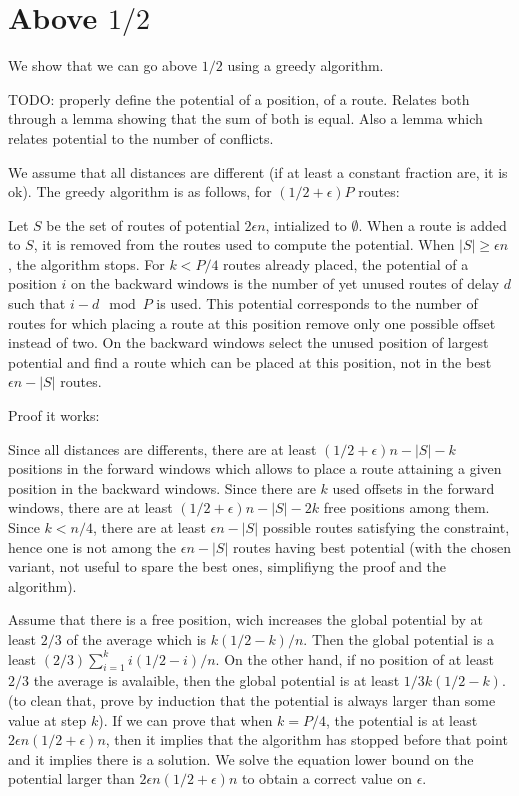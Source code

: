 \documentclass[10pt, conference, letterpaper]{IEEEtran}
\begin{document}
\section{Above $1/2$}

We show that we can go above $1/2$ using a greedy algorithm.

TODO: properly define the potential of a position, of a route. Relates both through a lemma 
showing that the sum of both is equal. 
Also a lemma which relates potential to the number of conflicts. 

We assume that all distances are different (if at least a constant fraction are, it is ok).
The greedy algorithm is as follows, for $(1/2 + \epsilon)P$ routes:

Let $S$ be the set of routes of potential $2\epsilon n$, intialized to $\emptyset$.
When a route is added to $S$, it is removed from the routes used to compute the potential. 
When $|S| \geq \epsilon n$, the algorithm stops.
For $k < P/4$ routes already placed, the potential of a position $i$ on the backward windows 
is the number of yet unused routes of delay $d$ such that $i-d \mod P$ is used.
This potential corresponds to the number of routes for which placing a route at this position
remove only one possible offset instead of two.
On the backward windows select the unused position of largest potential and find a route which can be 
placed at this position, not in the best $\epsilon n - |S|$ routes.  

Proof it works: 

Since all distances are differents, 
there are at least $(1/2 + \epsilon)n - |S|- k$ positions in the forward windows which allows
to place a route attaining a given position in the backward windows. 
Since there are $k$ used offsets in the forward windows, there are at least $(1/2 + \epsilon)n - |S|- 2k$ free positions among them. Since $k < n/4$, there are at least $\epsilon n - |S|$ possible routes satisfying the constraint, hence one is not among the $\epsilon n - |S|$ routes having best potential
(with the chosen variant, not useful to spare the best ones, simplifiyng the proof and the algorithm).


Assume that there is a free position, wich increases the global potential by at least $2/3$
of the average which is $k(1/2 - k)/n$. Then the global potential is a least $(2/3)\sum_{i=1}^{k}i(1/2 - i)/n$. On the other hand, if no position of at least $2/3$ the average is avalaible, then the global
potential is at least $1/3 k(1/2 - k)$. (to clean that, prove by induction that the potential is always larger than some value at step $k$).
If we can prove that when $k = P/4$, the potential is at least $2\epsilon n (1/2 + \epsilon)n$, then 
it implies that the algorithm has stopped before that point and it implies there is a solution.
We solve the equation lower bound on the potential larger than $2\epsilon n (1/2 + \epsilon)n$
to obtain a correct value on $\epsilon$.
\end{document}
